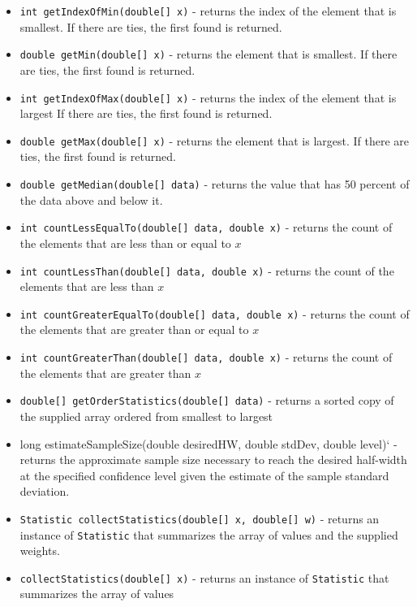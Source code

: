 \documentclass[
]{book}
\providecommand{\tightlist}{%
  \setlength{\itemsep}{0pt}\setlength{\parskip}{0pt}}
\theoremstyle{definition}
\theoremstyle{definition}
\theoremstyle{definition}
\theoremstyle{definition}
\theoremstyle{remark}
\begin{document}
\begin{itemize}
\tightlist
\item
  \texttt{int\ getIndexOfMin(double{[}{]}\ x)} - returns the index of the element that is smallest. If there are ties, the first found is returned.
\item
  \texttt{double\ getMin(double{[}{]}\ x)} - returns the element that is smallest. If there are ties, the first found is returned.
\item
  \texttt{int\ getIndexOfMax(double{[}{]}\ x)} - returns the index of the element that is largest If there are ties, the first found is returned.
\item
  \texttt{double\ getMax(double{[}{]}\ x)} - returns the element that is largest. If there are ties, the first found is returned.
\item
  \texttt{double\ getMedian(double{[}{]}\ data)} - returns the value that has 50 percent of the data above and below it.
\item
  \texttt{int\ countLessEqualTo(double{[}{]}\ data,\ double\ x)} - returns the count of the elements that are less than or equal to \(x\)
\item
  \texttt{int\ countLessThan(double{[}{]}\ data,\ double\ x)} - returns the count of the elements that are less than \(x\)
\item
  \texttt{int\ countGreaterEqualTo(double{[}{]}\ data,\ double\ x)} - returns the count of the elements that are greater than or equal to \(x\)
\item
  \texttt{int\ countGreaterThan(double{[}{]}\ data,\ double\ x)} - returns the count of the elements that are greater than \(x\)
\item
  \texttt{double{[}{]}\ getOrderStatistics(double{[}{]}\ data)} - returns a sorted copy of the supplied array ordered from smallest to largest
\item
  long estimateSampleSize(double desiredHW, double stdDev, double level)` - returns the approximate sample size necessary to reach the desired half-width at the specified confidence level given the estimate of the sample standard deviation.
\item
  \texttt{Statistic\ collectStatistics(double{[}{]}\ x,\ double{[}{]}\ w)} - returns an instance of \texttt{Statistic} that summarizes the array of values and the supplied weights.
\item
  \texttt{collectStatistics(double{[}{]}\ x)} - returns an instance of \texttt{Statistic} that summarizes the array of values
\end{itemize}
\end{document}
